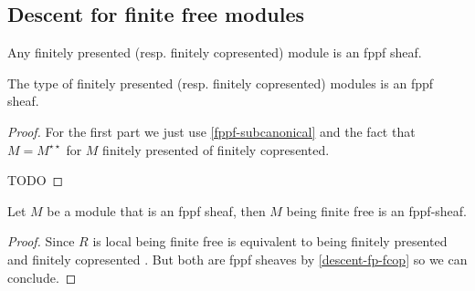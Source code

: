 \subsection{Descent for finite free modules}

\begin{lemma}\label{descent-fp-fcop}
Any finitely presented (resp. finitely copresented) module is an fppf sheaf.

The type of finitely presented (resp. finitely copresented) modules is an fppf sheaf.
\end{lemma}

\begin{proof}
For the first part we just use \cref{fppf-subcanonical} and the fact that $M=M^{\star\star}$ for $M$ finitely presented of finitely copresented.

TODO
\end{proof}

\begin{proposition}
Let $M$ be a module that is an fppf sheaf, then $M$ being finite free is an fppf-sheaf.
\end{proposition}

\begin{proof}
Since $R$ is local being finite free is equivalent to being finitely presented and finitely copresented \cite{TODO}. But both are fppf sheaves by \cref{descent-fp-fcop} so we can conclude.
\end{proof}